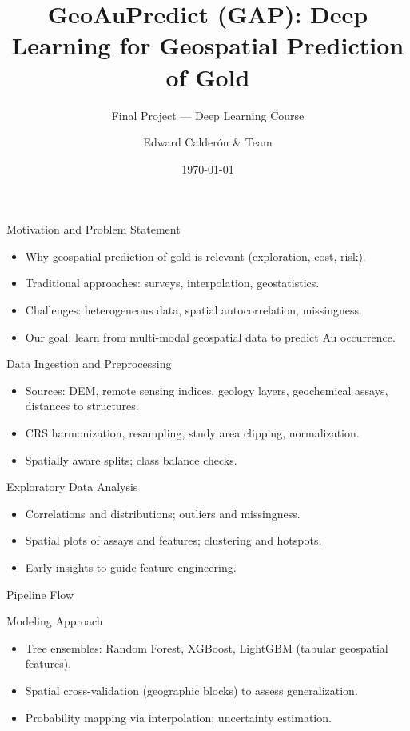 \documentclass[aspectratio=169]{beamer}
\title{GeoAuPredict (GAP): Deep Learning for Geospatial Prediction of Gold}
\subtitle{Final Project — Deep Learning Course}
\author{Edward Calderón \& Team}
\date{\today}
\begin{document}
\frame{\titlepage}

\begin{frame}{Motivation and Problem Statement}
  \begin{itemize}
    \item Why geospatial prediction of gold is relevant (exploration, cost, risk).
    \item Traditional approaches: surveys, interpolation, geostatistics.
    \item Challenges: heterogeneous data, spatial autocorrelation, missingness.
    \item Our goal: learn from multi-modal geospatial data to predict Au occurrence.
  \end{itemize}
\end{frame}

\begin{frame}{Data Ingestion and Preprocessing}
  \begin{itemize}
    \item Sources: DEM, remote sensing indices, geology layers, geochemical assays, distances to structures.
    \item CRS harmonization, resampling, study area clipping, normalization.
    \item Spatially aware splits; class balance checks.
  \end{itemize}
\end{frame}

\begin{frame}{Exploratory Data Analysis}
  \begin{itemize}
    \item Correlations and distributions; outliers and missingness.
    \item Spatial plots of assays and features; clustering and hotspots.
    \item Early insights to guide feature engineering.
  \end{itemize}
\end{frame}

\begin{frame}{Pipeline Flow}
  \centering
  \resizebox{!}{0.78\textheight}{}
\end{frame}

\begin{frame}{Modeling Approach}
  \begin{itemize}
    \item Tree ensembles: Random Forest, XGBoost, LightGBM (tabular geospatial features).
    \item Spatial cross-validation (geographic blocks) to assess generalization.
    \item Probability mapping via interpolation; uncertainty estimation.
  \end{itemize}
\end{frame}
\end{document}
